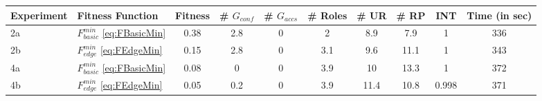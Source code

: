 \begin{landscape}
    \begin{table}
        \centering
        \begin{tabular}{|l|l|c|c|c|c|c|c|c|c|}
            \hline
            \rowcolor{myGray} 
            \textbf{Experiment} & \textbf{Fitness Function} & \textbf{Fitness} & \textbf{\# $G_{conf}$} & \textbf{\# $G_{accs}$} & \textbf{\# Roles} & \textbf{\# UR} & \textbf{\# RP} & \textbf{INT} & \textbf{Time (in sec)}\\ \hline
            2a & $F_{basic}^{min}$ \eqref{eq:FBasicMin}   &   0.38   &   2.8   &   0   &   2   &   8.9   &   7.9   &  1   &   336\\ \hline
            2b & $F_{edge}^{min}$ \eqref{eq:FEdgeMin}   &    0.15    &   2.8   &   0   &   3.1   &   9.6   &   11.1   &   1   &   343\\ \hline
            
            4a & $F_{basic}^{min}$ \eqref{eq:FBasicMin}   &   0.08   &   0   &   0   &   3.9   &   10   &   13.3   &   1   & 372\\ \hline
            4b & $F_{edge}^{min}$ \eqref{eq:FEdgeMin}   &   0.05   &   0.2   &   0   &   3.9   &   11.4   &   10.8   &   0.998   & 371\\ \hline
            

\end{tabular}
\end{table}
\end{landscape}
